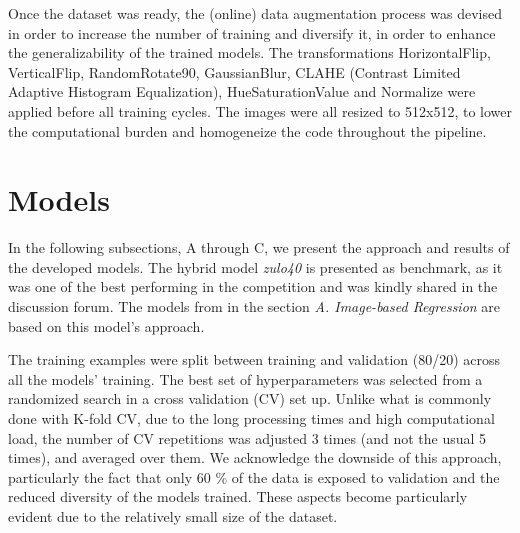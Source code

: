 \documentclass[conference]{IEEEtran}
\begin{document}


Once the dataset was ready, the (online) data augmentation process was devised in order to increase the number of training and diversify it, in order to enhance the generalizability of the trained models. The transformations HorizontalFlip, VerticalFlip, RandomRotate90, GaussianBlur, CLAHE (Contrast Limited Adaptive Histogram Equalization), HueSaturationValue and Normalize were applied before all training cycles. The images were all resized to 512x512, to lower the computational burden and homogeneize the code throughout the pipeline. 

\section{Models}

In the following subsections, A through C, we present the approach and results of the developed models. The hybrid model \textit{zulo40} is presented as benchmark, as it was one of the best performing in the competition and was kindly shared in the discussion forum. The models from in the section \textit{A. Image-based Regression} are based on this model's approach.

The training examples were split between training and validation (80/20) across all the models' training. The best set of hyperparameters was selected from a randomized search in a cross validation (CV) set up. Unlike what is commonly done with K-fold CV, due to the long processing times and high computational load, the number of CV repetitions was adjusted 3 times (and not the usual 5 times), and averaged over them. We acknowledge the downside of this approach, particularly the fact that only 60 \% of the data is exposed to validation and the reduced diversity of the models trained. These aspects become particularly evident due to the relatively small size of the dataset.
\end{document}
